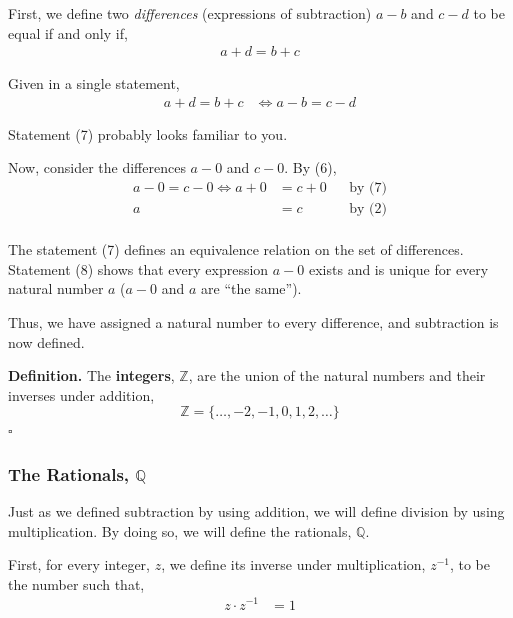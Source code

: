 \documentclass[letterpaper,twoside]{article}
\def\SmallHSpace{\hspace*{1mm}}
\newcommand{\DefinedTerm}[1]{\textbf{#1}}
\newcommand{\Definition}[1]{%
    \emoji{book} \textbf{Definition.}\SmallHSpace #1 \hfill $\square$
}
\begin{document}
\begin{multicols}{2}
First, we define two \textit{differences} (expressions of subtraction) $a-b$ and $c-d$ to be equal if and only if,
\begin{align}
    a+d=b+c 
\end{align}

Given in a single statement,
\begin{align}
    a+d=b+c &\Longleftrightarrow a-b = c-d
\end{align}

Statement (7) probably looks familiar to you.

Now, consider the differences $a-0$ and $c-0$.
By (6),
\begin{align*}
    a-0=c-0 \Longleftrightarrow a+0&=c+0 &&\text{by (7)}\\
    a&=c &&\text{by (2)}\\
\end{align*}

The statement (7) defines an equivalence relation on the set of differences.
Statement (8) shows that every expression $a-0$ exists and is unique for every natural number $a$ ($a-0$ and $a$ are ``the same'').

Thus, we have assigned a natural number to every difference, and subtraction is now defined.

\Definition
{
    The \DefinedTerm{integers}, $\mathbb{Z}$, are the union of the natural numbers and their inverses under addition,
    \[
        \mathbb{Z} = \{ \ldots, -2, -1, 0, 1, 2, \ldots \}
    \]
}

\subsubsection{The Rationals, $\mathbb{Q}$}

Just as we defined subtraction by using addition, we will define division by using multiplication.
By doing so, we will define the rationals, $\mathbb{Q}$.

First, for every integer, $z$, we define its inverse under multiplication, $z^{-1}$, to be the number such that,
\begin{align}
    z\cdot z^{-1} &= 1
\end{align}


\end{multicols}
\end{document}
